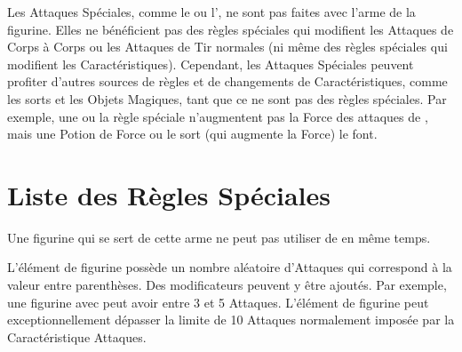 Les Attaques Spéciales, comme le \stomp{} ou l'\breathweapon{}, ne sont pas faites avec l'arme de la figurine. Elles ne bénéficient pas des règles spéciales qui modifient les Attaques de Corps à Corps ou les Attaques de Tir normales (ni même des règles spéciales qui modifient les Caractéristiques). Cependant, les Attaques Spéciales peuvent profiter d'autres sources de règles et de changements de Caractéristiques, comme les sorts et les Objets Magiques, tant que ce ne sont pas des règles spéciales. Par exemple, une \gw{} ou la règle spéciale \thunderouscharge{} n'augmentent pas la Force des attaques de \stomp{}, mais une Potion de Force ou le sort \og \shamanismspellzero{} \fg{} (qui augmente la Force) le font.

\vspace*{20pt}
\begin{framed}
\vspace*{-10pt}
\setlength\columnseprule{0.5pt}
\begin{multicols}{3}\raggedcolumns
\noindent\hyperlink{grindingattacks}{\grindingattacks{}}\newline
\hyperlink{crushattack}{\crushattack}\newline
\hyperlink{sweepingattack}{\sweepingattack}\newline
\hyperlink{breathweapon}{\breathweapon{}}\newline
\hyperlink{stomp}{\stomp{}}\newline
\hyperlink{impacthits}{\impacthits{}}
\end{multicols}
\setlength\columnseprule{0pt}
\vspace*{-10pt}
\end{framed}

\newpage
\section{Liste des Règles Spéciales} 


Une figurine qui se sert de cette arme ne peut pas utiliser de \shield{} en même temps.


L'élément de figurine possède un nombre aléatoire d'Attaques qui correspond à la valeur entre parenthèses. Des modificateurs peuvent y être ajoutés. Par exemple, une figurine avec  peut avoir entre 3 et 5 Attaques. L'élément de figurine peut exceptionnellement dépasser la limite de 10 Attaques normalement imposée par la Caractéristique Attaques.

